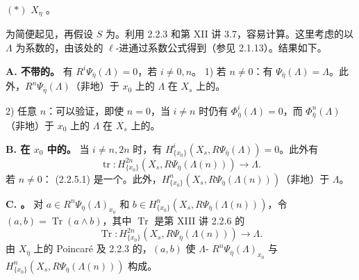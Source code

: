 $(*)$  $X_\eta$ 。

为简便起见，再假设 $S$ 为。利用 2.2.3 和第 XII 讲 3.7，容易计算。这里考虑的以 $\Lambda$ 为系数的，由该处的 $\ell$-进通过系数公式得到（参见 2.1.13）。结果如下。

\textbf{A. 不带的。}
有 $R^i\Psi_{\bar\eta}(\Lambda)=0$，若 $i\ne0,n$。
1) 若 $n\ne0$：有 $\Psi_{\bar\eta}(\Lambda)=\Lambda$。此外，$R^n\Psi_{\bar\eta}(\Lambda)$（非地）于 $x_0$ 上的 $\Lambda$ 在 $X_s$ 上的。

2) 任意 $n$：可以验证，即使 $n=0$，当 $i\ne n$ 时仍有 $\Phi^i_{\bar\eta}(\Lambda)=0$，而 $\Phi^n_{\bar\eta}(\Lambda)$（非地）于 $x_0$ 上的 $\Lambda$ 在 $X_s$ 上的。

\textbf{B. 在 $x_0$ 中的。}
当 $i\ne n,2n$ 时，有 $H^i_{\{x_0\}}(X_s,R\Psi_{\bar\eta}(\Lambda))=0$。此外有
\[
 \operatorname{tr}:H^{2n}_{\{x_0\}}(X_s,R\Psi_{\bar\eta}(\Lambda(n)))\longrightarrow\Lambda.\tag{2.2.5.1}
\]
若 $n\ne0$： (2.2.5.1) 是一个。此外，$H^n_{\{x_0\}}(X_s,R\Psi_{\bar\eta}(\Lambda(n)))$（非地）于 $\Lambda$。

\textbf{C. 。} 对 $a\in R^n\Psi_{\bar\eta}(\Lambda)_{x_0}$ 和 $b\in H^n_{\{x_0\}}(X_s,R\Psi_{\bar\eta}(\Lambda(n)))$，令 $(a,b)=\operatorname{Tr}(a\wedge b)$，其中 $\operatorname{Tr}$ 是第 XIII 讲 2.2.6 的
\[
 \operatorname{Tr}:H^{2n}_{\{x_0\}}(X_s,R\Psi_{\bar\eta}(\Lambda(n)))\longrightarrow\Lambda.
\]
由 $X_{\bar\eta}$ 上的 Poincaré 及 2.2.3 的，$(a,b)$ 使 $\Lambda$- $R^n\Psi_{\bar\eta}(\Lambda)_{x_0}$ 与 $H^n_{\{x_0\}}(X_s,R\Psi_{\bar\eta}(\Lambda(n)))$ 构成。

